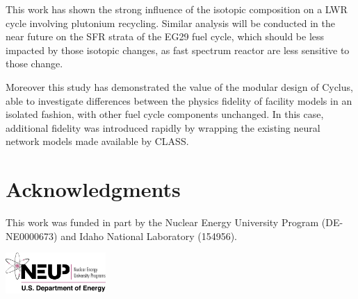 \documentclass{anstrans}
\begin{document}
This work has shown the strong influence of the isotopic composition on a LWR
cycle involving plutonium recycling. Similar analysis will be conducted in the
near future on the SFR strata of the EG29 fuel cycle, which should be less
impacted by those isotopic changes, as fast spectrum reactor are less sensitive
to those change.

Moreover this study has demonstrated the value of the modular design of
Cyclus, able to investigate differences between the physics fidelity of
facility models in an isolated fashion, with other fuel cycle components
unchanged.  In this case, additional fidelity was introduced rapidly by
wrapping the existing neural network models made available by CLASS.



%

\section{Acknowledgments} 
This work was funded in part by the Nuclear Energy University Program 
(DE-NE0000673) and Idaho National Laboratory (154956).
\begin{center}
\includegraphics[width=1.5in]{neup_logo_large.jpg}
\end{center}



\end{document}
